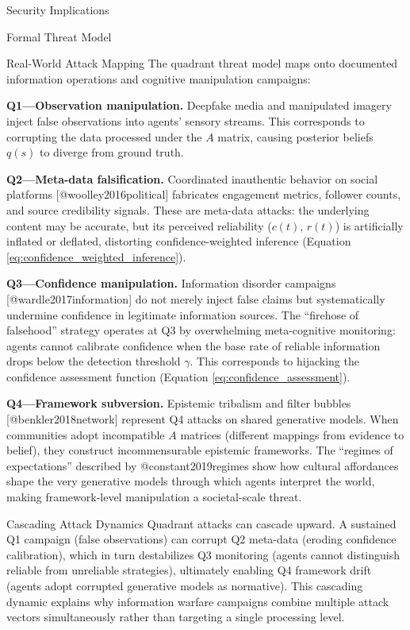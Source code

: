 \documentclass[
  ignorenonframetext,
]{beamer}
\begin{document}
\begin{frame}{Security Implications}
\begin{block}{Formal Threat Model}
\begin{block}{Real-World Attack Mapping}
\protect{}\label{real-world-attack-mapping}
The quadrant threat model maps onto documented information operations
and cognitive manipulation campaigns:

\textbf{Q1---Observation manipulation.} Deepfake media and manipulated
imagery inject false observations into agents' sensory streams. This
corresponds to corrupting the data processed under the \(A\) matrix,
causing posterior beliefs \(q(s)\) to diverge from ground truth.

\textbf{Q2---Meta-data falsification.} Coordinated inauthentic behavior
on social platforms {[}@woolley2016political{]} fabricates engagement
metrics, follower counts, and source credibility signals. These are
meta-data attacks: the underlying content may be accurate, but its
perceived reliability (\(c(t)\), \(r(t)\)) is artificially inflated or
deflated, distorting confidence-weighted inference (Equation
\eqref{eq:confidence_weighted_inference}).

\textbf{Q3---Confidence manipulation.} Information disorder campaigns
{[}@wardle2017information{]} do not merely inject false claims but
systematically undermine confidence in legitimate information sources.
The ``firehose of falsehood'' strategy operates at Q3 by overwhelming
meta-cognitive monitoring: agents cannot calibrate confidence when the
base rate of reliable information drops below the detection threshold
\(\gamma\). This corresponds to hijacking the confidence assessment
function (Equation \eqref{eq:confidence_assessment}).

\textbf{Q4---Framework subversion.} Epistemic tribalism and filter
bubbles {[}@benkler2018network{]} represent Q4 attacks on shared
generative models. When communities adopt incompatible \(A\) matrices
(different mappings from evidence to belief), they construct
incommensurable epistemic frameworks. The ``regimes of expectations''
described by @constant2019regimes show how cultural affordances shape
the very generative models through which agents interpret the world,
making framework-level manipulation a societal-scale threat.
\end{block}

\begin{block}{Cascading Attack Dynamics}
\protect{}\label{cascading-attack-dynamics}
Quadrant attacks can cascade upward. A sustained Q1 campaign (false
observations) can corrupt Q2 meta-data (eroding confidence calibration),
which in turn destabilizes Q3 monitoring (agents cannot distinguish
reliable from unreliable strategies), ultimately enabling Q4 framework
drift (agents adopt corrupted generative models as normative). This
cascading dynamic explains why information warfare campaigns combine
multiple attack vectors simultaneously rather than targeting a single
processing level.
\end{block}


\end{block}
\end{frame}
\end{document}
